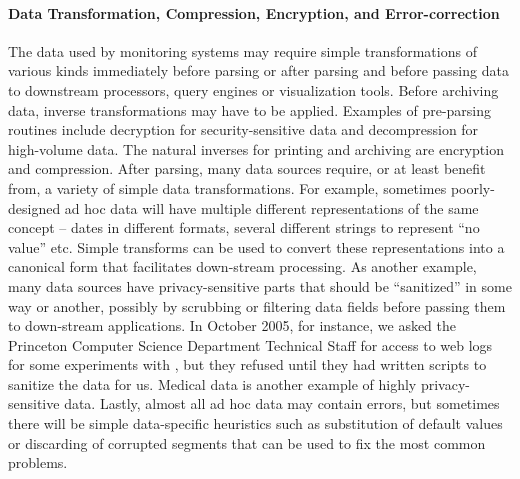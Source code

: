\paragraph*{Data Transformation, Compression, Encryption, and Error-correction}
The data used by monitoring systems may require simple transformations 
of various kinds
immediately before parsing or after parsing and before
passing data to downstream processors, query engines or 
visualization tools.  Before archiving data,
inverse transformations may have to be applied.  
Examples of pre-parsing routines include decryption for
security-sensitive data and decompression for high-volume data.  
The natural inverses for printing and archiving 
are encryption and compression.
After parsing, many data sources require, or at least benefit from,
a variety of simple data transformations.  For example,
sometimes poorly-designed
ad hoc data will have multiple different representations
of the same concept -- dates in different formats, several different strings
to represent ``no value'' etc.  Simple transforms can be used to convert
these representations into a canonical form that facilitates down-stream
processing.  As another example, many data sources have privacy-sensitive parts
that should be ``sanitized'' in some way or another, possibly by scrubbing or
filtering data fields before passing them to down-stream applications.
In October 2005, for instance, we asked the Princeton Computer Science
Department Technical Staff for access to web logs for some experiments
with \pads, but they refused until they had written scripts to
sanitize the data for us.  Medical data is another example of highly
privacy-sensitive data.
Lastly, almost all ad hoc data may contain errors, but sometimes there 
will be simple data-specific heuristics such as substitution of default values
or discarding of corrupted segments
that can be used to fix the most common problems.


